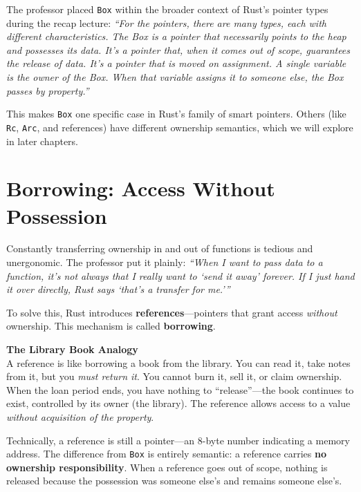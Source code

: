 The professor placed \texttt{Box} within the broader context of Rust's pointer types during the recap lecture: \emph{``For the pointers, there are many types, each with different characteristics. The Box is a pointer that necessarily points to the heap and possesses its data. It's a pointer that, when it comes out of scope, guarantees the release of data. It's a pointer that is moved on assignment. A single variable is the owner of the Box. When that variable assigns it to someone else, the Box passes by property.''}

This makes \texttt{Box} one specific case in Rust's family of smart pointers. Others (like \texttt{Rc}, \texttt{Arc}, and references) have different ownership semantics, which we will explore in later chapters.

\section{Borrowing: Access Without Possession}

Constantly transferring ownership in and out of functions is tedious and unergonomic. The professor put it plainly: \emph{``When I want to pass data to a function, it's not always that I really want to `send it away' forever. If I just hand it over directly, Rust says `that's a transfer for me.'''}

To solve this, Rust introduces \textbf{references}---pointers that grant access \emph{without} ownership. This mechanism is called \textbf{borrowing}.

\begin{insightbox}
\textbf{The Library Book Analogy} \\
A reference is like borrowing a book from the library. You can read it, take notes from it, but you \emph{must return it}. You cannot burn it, sell it, or claim ownership. When the loan period ends, you have nothing to ``release''---the book continues to exist, controlled by its owner (the library). The reference allows access to a value \emph{without acquisition of the property}.
\end{insightbox}

Technically, a reference is still a pointer---an 8-byte number indicating a memory address. The difference from \texttt{Box} is entirely semantic: a reference carries \textbf{no ownership responsibility}. When a reference goes out of scope, nothing is released because the possession was someone else's and remains someone else's.

